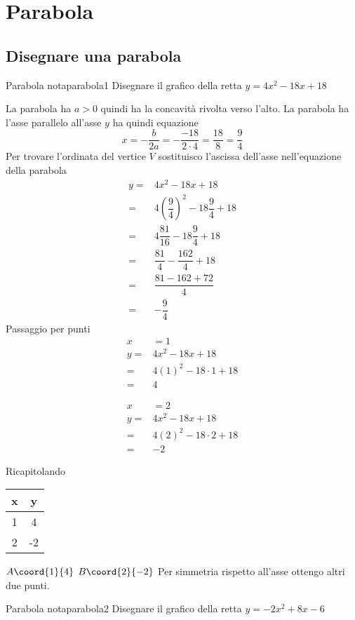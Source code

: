 \chapter{Parabola}
\label{cha:parabola}
\section{Disegnare una parabola}
\begin{esempiot}{Parabola nota}{parabola1}
	Disegnare il grafico della retta $y=4x^2-18x+18$
	\end{esempiot}
	La parabola ha $a>0$ quindi ha la concavità rivolta verso l'alto. La parabola ha l'asse parallelo all'asse $y$ ha quindi equazione\[ x=-\dfrac{b}{2a}=-\dfrac{-18}{2\cdot 4}=\dfrac{18}{8}=\dfrac{9}{4}\]
	Per trovare l'ordinata del vertice $V$ sostituisco l'ascissa dell'asse nell'equazione della parabola
	\begin{align*}
y=&4x^2-18x+18\\
=&4\left( \dfrac{9}{4}\right)^2-18\dfrac{9}{4}+18\\
=&4\dfrac{81}{16}-18\dfrac{9}{4}+18\\
=&\dfrac{81}{4}-\dfrac{162}{4}+18\\
=&\dfrac{81-162+72}{4}\\
=&-\dfrac{9}{4}
	\end{align*}
Passaggio per punti
\begin{align*}
x&=1\\
y=&4x^2-18x+18\\
=&4(1)^2-18\cdot1 +18\\
=&4
\end{align*}

\begin{align*}
x&=2\\
y=&4x^2-18x+18\\
=&4(2)^2-18\cdot2 +18\\
=&-2
\end{align*}

Ricapitolando
		\begin{tabular}{c|c}
			x & y\\
			\hline 
			1& 4 \\ 
			2&-2  \\ 
		\end{tabular}
			
$A\coord{1}{4}$ $B\coord{2}{-2}$ Per simmetria rispetto all'asse ottengo altri due punti.
\begin{center}
	
	\label{fig:disegnoparabola1}
\end{center}
\begin{esempiot}{Parabola nota}{parabola2}
	Disegnare il grafico della retta $y=-2x^2+8x-6$
\end{esempiot}
\begin{center}
	
	\label{fig:disegnoparabola2}
\end{center}
	
